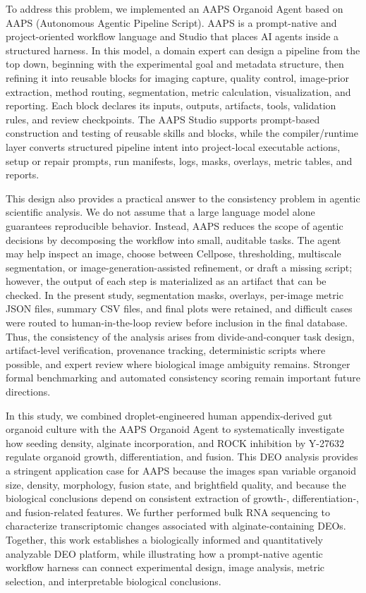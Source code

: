 \documentclass[
]{article}
\begin{document}
To address this problem, we implemented an AAPS Organoid Agent based on AAPS (Autonomous Agentic Pipeline Script). AAPS is a prompt-native and project-oriented workflow language and Studio that places AI agents inside a structured harness. In this model, a domain expert can design a pipeline from the top down, beginning with the experimental goal and metadata structure, then refining it into reusable blocks for imaging capture, quality control, image-prior extraction, method routing, segmentation, metric calculation, visualization, and reporting. Each block declares its inputs, outputs, artifacts, tools, validation rules, and review checkpoints. The AAPS Studio supports prompt-based construction and testing of reusable skills and blocks, while the compiler/runtime layer converts structured pipeline intent into project-local executable actions, setup or repair prompts, run manifests, logs, masks, overlays, metric tables, and reports.

This design also provides a practical answer to the consistency problem in agentic scientific analysis. We do not assume that a large language model alone guarantees reproducible behavior. Instead, AAPS reduces the scope of agentic decisions by decomposing the workflow into small, auditable tasks. The agent may help inspect an image, choose between Cellpose, thresholding, multiscale segmentation, or image-generation-assisted refinement, or draft a missing script; however, the output of each step is materialized as an artifact that can be checked. In the present study, segmentation masks, overlays, per-image metric JSON files, summary CSV files, and final plots were retained, and difficult cases were routed to human-in-the-loop review before inclusion in the final database. Thus, the consistency of the analysis arises from divide-and-conquer task design, artifact-level verification, provenance tracking, deterministic scripts where possible, and expert review where biological image ambiguity remains. Stronger formal benchmarking and automated consistency scoring remain important future directions.

In this study, we combined droplet-engineered human appendix-derived gut organoid culture with the AAPS Organoid Agent to systematically investigate how seeding density, alginate incorporation, and ROCK inhibition by Y-27632 regulate organoid growth, differentiation, and fusion. This DEO analysis provides a stringent application case for AAPS because the images span variable organoid size, density, morphology, fusion state, and brightfield quality, and because the biological conclusions depend on consistent extraction of growth-, differentiation-, and fusion-related features. We further performed bulk RNA sequencing to characterize transcriptomic changes associated with alginate-containing DEOs. Together, this work establishes a biologically informed and quantitatively analyzable DEO platform, while illustrating how a prompt-native agentic workflow harness can connect experimental design, image analysis, metric selection, and interpretable biological conclusions.
\end{document}
